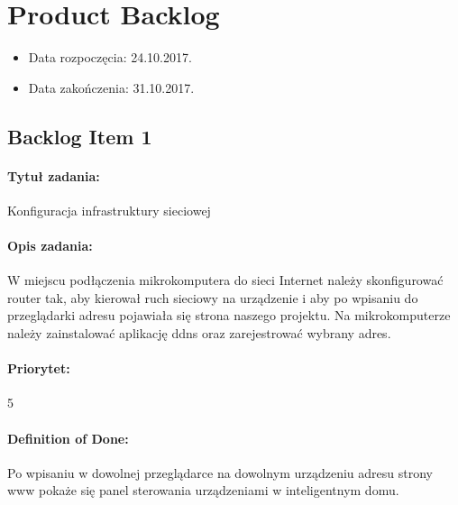 	


\section{Product Backlog}
	\begin{itemize}
		\item Data rozpoczęcia: 24.10.2017.
		\item  Data zakończenia: 31.10.2017.
	\end{itemize}

	\subsection{Backlog Item 1}
	\paragraph{Tytuł zadania:}
	Konfiguracja infrastruktury sieciowej
	
	\paragraph{Opis zadania:}
	W miejscu podłączenia mikrokomputera do sieci Internet należy skonfigurować router tak, aby kierował ruch sieciowy na urządzenie i aby po wpisaniu do przeglądarki adresu pojawiała się strona naszego projektu. Na mikrokomputerze należy zainstalować aplikację ddns oraz zarejestrować wybrany adres.
	
	\paragraph{Priorytet:}
	5
	
	\paragraph{Definition of Done:}
	Po wpisaniu w dowolnej przeglądarce na dowolnym urządzeniu adresu strony www pokaże się panel sterowania urządzeniami w inteligentnym domu.
	

